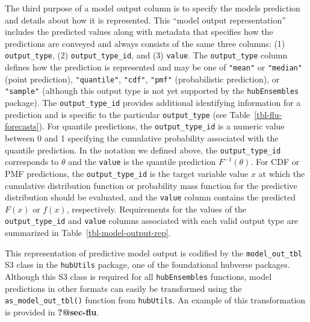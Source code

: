 \documentclass[
  article,
  shortnames,
  notitle]{jss}
\begin{document}
The third purpose of a model output column is to specify the models
prediction and details about how it is represented. This ``model output
representation'' includes the predicted values along with metadata that
specifies how the predictions are conveyed and always consists of the
same three columns: (1) \texttt{output\_type}, (2)
\texttt{output\_type\_id}, and (3) \texttt{value}. The
\texttt{output\_type} column defines how the prediction is represented
and may be one of \texttt{"mean"} or \texttt{"median"} (point
prediction), \texttt{"quantile"}, \texttt{"cdf"}, \texttt{"pmf"}
(probabilistic prediction), or \texttt{"sample"} (although this output
type is not yet supported by the \texttt{hubEnsembles} package). The
\texttt{output\_type\_id} provides additional identifying information
for a prediction and is specific to the particular \texttt{output\_type}
(see Table~\ref{tbl-flu-forecasts}). For quantile predictions, the
\texttt{output\_type\_id} is a numeric value between 0 and 1 specifying
the cumulative probability associated with the quantile prediction. In
the notation we defined above, the \texttt{output\_type\_id} corresponds
to \(\theta\) and the \texttt{value} is the quantile prediction
\(F^{-1}(\theta)\). For CDF or PMF predictions, the
\texttt{output\_type\_id} is the target variable value \(x\) at which
the cumulative distribution function or probability mass function for
the predictive distribution should be evaluated, and the \texttt{value}
column contains the predicted \(F(x)\) or \(f(x)\), respectively.
Requirements for the values of the \texttt{output\_type\_id} and
\texttt{value} columns associated with each valid output type are
summarized in Table~\ref{tbl-model-output-rep}.

This representation of predictive model output is codified by the
\texttt{model\_out\_tbl} S3 class in the \texttt{hubUtils} package, one
of the foundational hubverse packages. Although this S3 class is
required for all \texttt{hubEnsembles} functions, model predictions in
other formats can easily be transformed using the
\texttt{as\_model\_out\_tbl()} function from \texttt{hubUtils}. An
example of this transformation is provided in \textbf{?@sec-flu}.
\end{document}
